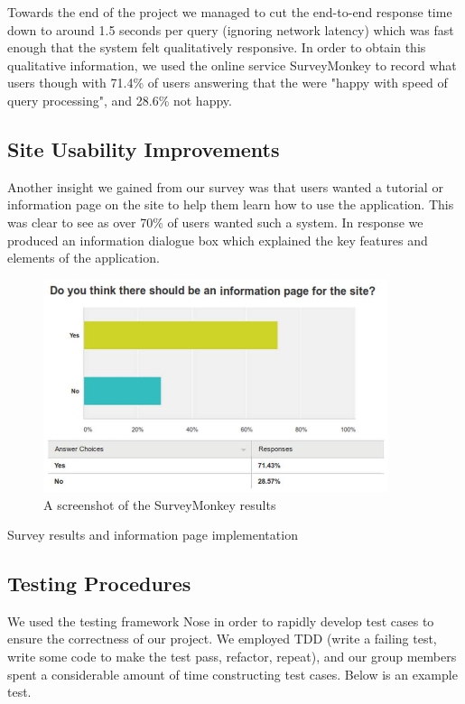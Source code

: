 \documentclass[a4paper, 11pt]{article}
\begin{document}
    Towards the  end of the project we managed to cut the end-to-end response time 
    down to  around 1.5 seconds per query (ignoring network latency) which was 
    fast enough that the system felt qualitatively responsive. In order to obtain 
    this qualitative information, we used the online service SurveyMonkey to record 
    what users though with 71.4\% of users answering that the were "happy with speed
    of query processing", and 28.6\% not happy. 

    \subsection{Site Usability Improvements}
    Another insight we gained from our survey was that users wanted a tutorial
    or information page on the site to help them learn how to use the
    application. This was clear to see as over 70\% of users wanted such a
    system. In response we produced an information dialogue box which explained
    the key features and elements of the application.

    \begin{figure}
      \centering
      \includegraphics[width=0.9\textwidth]{images/survey.jpg}
      \caption{A screenshot of the SurveyMonkey results} 
    \end{figure}
    Survey results and information page implementation
    \subsection{Testing Procedures}
    We used the testing framework Nose in order to rapidly develop test cases to
    ensure the correctness of our project. We employed TDD (write a failing
    test, write some code to make the test pass, refactor, repeat), and our group 
    members spent a considerable amount of time constructing test cases. Below is an 
    example test.
\end{document}
